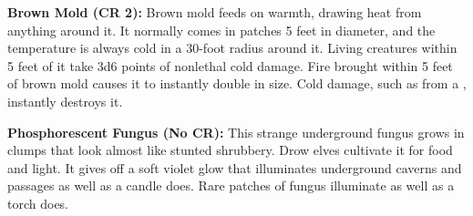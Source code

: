 \textbf{Brown Mold (CR 2):} Brown mold feeds on warmth, drawing heat from anything around it. It normally comes in patches 5 feet in diameter, and the temperature is always cold in a 30-foot radius around it. Living creatures within 5 feet of it take 3d6 points of nonlethal cold damage. Fire brought within 5 feet of brown mold causes it to instantly double in size. Cold damage, such as from a , instantly destroys it.

\textbf{Phosphorescent Fungus (No CR):} This strange underground fungus grows in clumps that look almost like stunted shrubbery. Drow elves cultivate it for food and light. It gives off a soft violet glow that illuminates underground caverns and passages as well as a candle does. Rare patches of fungus illuminate as well as a torch does.